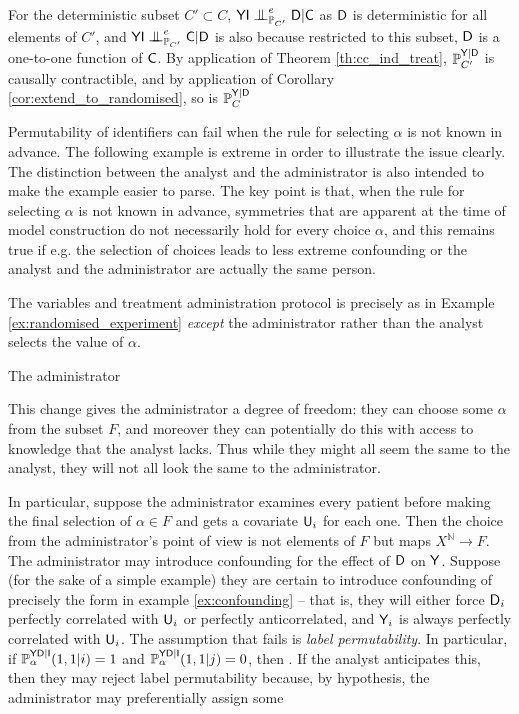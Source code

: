 \begin{example}
For the deterministic subset $C'\subset C$, $\RV{YI}\CI^e_{\prob{P}_{C'}} \RV{D}|\RV{C}$ as $\mathsf{D}$ is deterministic for all elements of $C'$, and $\RV{YI}\CI^e_{\prob{P}_{C'}} \RV{C}|\RV{D}$ is also because restricted to this subset, $\mathsf{D}$ is a one-to-one function of $\mathsf{C}$. By application of Theorem \ref{th:cc_ind_treat}, $\mathbb{P}_{C'}^{\mathsf{Y}|\mathsf{D}}$ is causally contractible, and by application of Corollary \ref{cor:extend_to_randomised}, so is $\mathbb{P}_{C}^{\mathsf{Y}|\mathsf{D}}$
\end{example}

Permutability of identifiers can fail when the rule for selecting $\alpha$ is not known in advance. The following example is extreme in order to illustrate the issue clearly. The distinction between the analyst and the administrator is also intended to make the example easier to parse. The key point is that, when the rule for selecting $\alpha$ is not known in advance, symmetries that are apparent at the time of model construction do not necessarily hold for every choice $\alpha$, and this remains true if e.g. the selection of choices leads to less extreme confounding or the analyst and the administrator are actually the same person.

\begin{example}\label{ex:bad_randomised_experiment}
The variables and treatment administration protocol is precisely as in Example \ref{ex:randomised_experiment} \emph{except} the administrator rather than the analyst selects the value of $\alpha$.

The administrator 

This change gives the administrator a degree of freedom: they can choose some $\alpha$ from the subset $F$, and moreover they can potentially do this with access to knowledge that the analyst lacks. Thus while they might all seem the same to the analyst, they will not all look the same to the administrator.

In particular, suppose the administrator examines every patient before making the final selection of $\alpha\in F$ and gets a covariate $\mathsf{U}_i$ for each one. Then the choice from the administrator's point of view is not elements of $F$ but maps $X^{\mathbb{N}}\to F$. The administrator may introduce confounding for the effect of $\mathsf{D}$ on $\mathsf{Y}$. Suppose (for the sake of a simple example) they are certain to introduce confounding of precisely the form in example \ref{ex:confounding} -- that is, they will either force $\mathsf{D}_i$ perfectly correlated with $\mathsf{U}_i$ or perfectly anticorrelated, and $\mathsf{Y}_i$ is always perfectly correlated with $\mathsf{U}_i$. The assumption that fails is \emph{label permutability}.  In particular, if $\mathbb{P}_\alpha^{\mathsf{YD}|\mathsf{I}}(1,1|i)=1$ and $\mathbb{P}_\alpha^{\mathsf{YD}|\mathsf{I}}(1,1|j)=0$, then . If the analyst anticipates this, then they may reject label permutability because, by hypothesis, the administrator may preferentially assign some 
\end{example}

